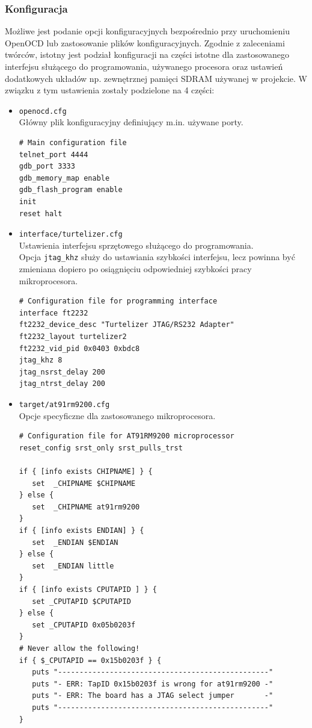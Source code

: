 \documentclass[a4paper,12pt]{book}
\begin{document}
				\subsubsection{Konfiguracja}
					Możliwe jest podanie opcji konfiguracyjnych bezpośrednio przy uruchomieniu OpenOCD lub zastosowanie plików konfiguracyjnych. Zgodnie z zaleceniami twórców, istotny jest podział konfiguracji na części istotne dla zastosowanego interfejsu służącego do programowania, używanego procesora oraz ustawień dodatkowych układów np. zewnętrznej pamięci SDRAM używanej w projekcie. W związku z tym ustawienia zostały podzielone na 4 części:
					\begin{itemize}
						\item{\texttt{openocd.cfg}}\\
							Główny plik konfiguracyjny definiujący m.in. używane porty.
							\begin{lstlisting}[basicstyle={\footnotesize\ttfamily}]
# Main configuration file
telnet_port 4444
gdb_port 3333
gdb_memory_map enable
gdb_flash_program enable
init
reset halt
							\end{lstlisting}
						\item{\texttt{interface/turtelizer.cfg}}\\
							Ustawienia interfejsu sprzętowego służącego do programowania.\\
							Opcja \texttt{jtag\_khz} służy do ustawiania szybkości interfejsu, lecz powinna być zmieniana dopiero po osiągnięciu odpowiedniej szybkości pracy mikroprocesora.
							\begin{lstlisting}[basicstyle={\footnotesize\ttfamily}]
# Configuration file for programming interface
interface ft2232
ft2232_device_desc "Turtelizer JTAG/RS232 Adapter"
ft2232_layout turtelizer2
ft2232_vid_pid 0x0403 0xbdc8			
jtag_khz 8
jtag_nsrst_delay 200
jtag_ntrst_delay 200
							\end{lstlisting}
						\item{\texttt{target/at91rm9200.cfg}}\\
							Opcje specyficzne dla zastosowanego mikroprocesora.
							\begin{lstlisting}[basicstyle={\footnotesize\ttfamily}]
# Configuration file for AT91RM9200 microprocessor
reset_config srst_only srst_pulls_trst

if { [info exists CHIPNAME] } {
   set  _CHIPNAME $CHIPNAME
} else {
   set  _CHIPNAME at91rm9200
}
if { [info exists ENDIAN] } {
   set  _ENDIAN $ENDIAN
} else {
   set  _ENDIAN little
}
if { [info exists CPUTAPID ] } {
   set _CPUTAPID $CPUTAPID
} else {
   set _CPUTAPID 0x05b0203f
}
# Never allow the following!
if { $_CPUTAPID == 0x15b0203f } {
   puts "-------------------------------------------------"
   puts "- ERR: TapID 0x15b0203f is wrong for at91rm9200 -"
   puts "- ERR: The board has a JTAG select jumper       -"
   puts "-------------------------------------------------"
}


\end{lstlisting}
\end{itemize}
\end{document}
